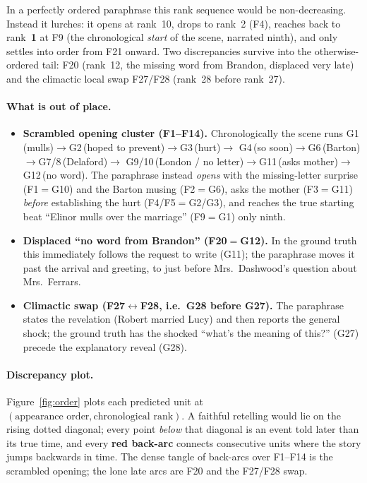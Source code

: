 \documentclass[11pt]{article}
\begin{document}
In a perfectly ordered paraphrase this rank sequence would be non-decreasing.
Instead it lurches: it opens at rank~10, drops to rank~2 (F4), reaches back to
rank~\textbf{1} at F9 (the chronological \emph{start} of the scene, narrated
ninth), and only settles into order from F21 onward. Two discrepancies survive
into the otherwise-ordered tail: F20 (rank~12, the missing word from Brandon,
displaced very late) and the climactic local swap F27/F28
(rank~28 before rank~27).

\paragraph{What is out of place.}
\begin{itemize}[leftmargin=*]
  \item \textbf{Scrambled opening cluster (F1--F14).} Chronologically the scene
        runs G1\,(mulls)$\to$G2\,(hoped to prevent)$\to$G3\,(hurt)$\to$
        G4\,(so soon)$\to$G6\,(Barton)$\to$G7/8\,(Delaford)$\to$
        G9/10\,(London / no letter)$\to$G11\,(asks mother)$\to$G12\,(no word).
        The paraphrase instead \emph{opens} with the missing-letter surprise
        (F1$=$G10) and the Barton musing (F2$=$G6), asks the mother (F3$=$G11)
        \emph{before} establishing the hurt (F4/F5$=$G2/G3), and reaches the true
        starting beat ``Elinor mulls over the marriage'' (F9$=$G1) only ninth.
  \item \textbf{Displaced ``no word from Brandon'' (F20$=$G12).} In the ground
        truth this immediately follows the request to write (G11); the paraphrase
        moves it past the arrival and greeting, to just before Mrs.~Dashwood's
        question about Mrs.~Ferrars.
  \item \textbf{Climactic swap (F27$\leftrightarrow$F28, i.e.\ G28 before G27).}
        The paraphrase states the revelation (Robert married Lucy) and then
        reports the general shock; the ground truth has the shocked
        ``what's the meaning of this?'' (G27) precede the explanatory reveal
        (G28).
\end{itemize}

\paragraph{Discrepancy plot.}
Figure~\ref{fig:order} plots each predicted unit at $(\text{appearance order},
\text{chronological rank})$. A faithful retelling would lie on the rising dotted
diagonal; every point \emph{below} that diagonal is an event told later than its
true time, and every \textbf{red back-arc} connects consecutive units where the
story jumps backwards in time. The dense tangle of back-arcs over F1--F14 is the
scrambled opening; the lone late arcs are F20 and the F27/F28 swap.
\end{document}
